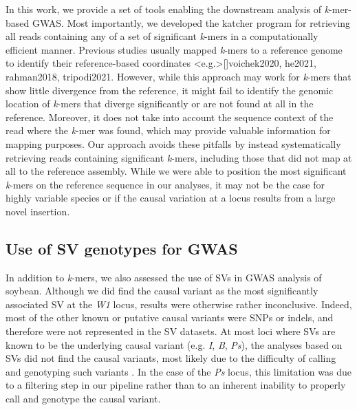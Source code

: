 \documentclass{article}
\begin{document}
In this work, we provide a set of tools enabling the downstream analysis of
\emph{k}-mer-based GWAS. Most importantly, we developed the katcher program for
retrieving all reads containing any of a set of significant \emph{k}-mers in a
computationally efficient manner. Previous studies usually mapped \emph{k}-mers
to a reference genome to identify their reference-based coordinates
\shortcite<e.g.>[]{voichek2020, he2021, rahman2018, tripodi2021}.  However, while
this approach may work for \emph{k}-mers that show little divergence from the
reference, it might fail to identify the genomic location of \emph{k}-mers that
diverge significantly or are not found at all in the reference. Moreover, it
does not take into account the sequence context of the read where the
\emph{k}-mer was found, which may provide valuable information for mapping
purposes. Our approach avoids these pitfalls by instead systematically
retrieving reads containing significant \emph{k}-mers, including those that did
not map at all to the reference assembly. While we were able to position the
most significant \emph{k}-mers on the reference sequence in our analyses, it
may not be the case for highly variable species or if the causal variation at a
locus results from a large novel insertion.

\subsection*{Use of SV genotypes for GWAS}

In addition to \emph{k}-mers, we also assessed the use of SVs in GWAS analysis
of soybean.  Although we did find the causal variant as the most significantly
associated SV at the \emph{W1} locus, results were otherwise rather
inconclusive.  Indeed, most of the other known or putative causal variants were
SNPs or indels, and therefore were not represented in the SV datasets. At most
loci where SVs are known to be the underlying causal variant (e.g.  \emph{I},
\emph{B}, \emph{Ps}), the analyses based on SVs did not find the causal
variants, most likely due to the difficulty of calling and genotyping such
variants . In the case of the \textit{Ps} locus,
this limitation was due to a filtering step in our pipeline rather than to an
inherent inability to properly call and genotype the causal variant.
\end{document}
